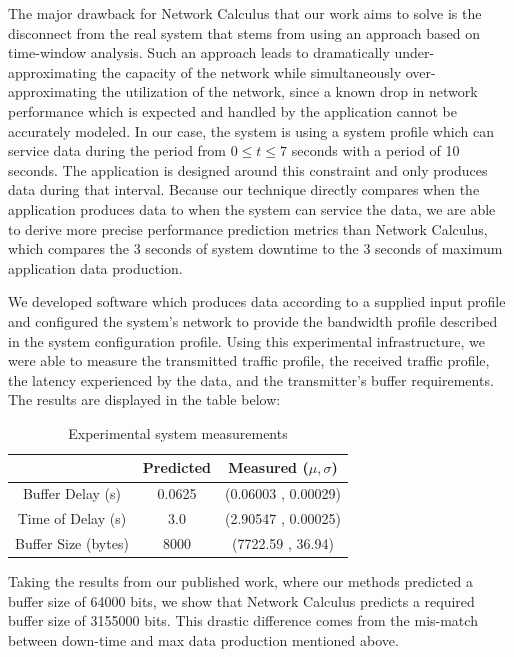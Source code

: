 The major drawback for Network Calculus that our work aims to solve is
the disconnect from the real system that stems from using an approach
based on time-window analysis.  Such an approach leads to dramatically
under-approximating the capacity of the network while simultaneously
over-approximating the utilization of the network, since a known drop
in network performance which is expected and handled by the
application cannot be accurately modeled.  In our case, the system is
using a system profile which can service data during the period from
$0\le t\le 7$ seconds with a period of 10 seconds.  The
application is designed around this constraint and only produces data
during that interval.  Because our technique directly compares when
the application produces data to when the system can service the data,
we are able to derive more precise performance prediction metrics than
Network Calculus, which compares the 3 seconds of system downtime to
the 3 seconds of maximum application data production.

We developed software which produces data according to a supplied
input profile and configured the system's network to provide the
bandwidth profile described in the system configuration profile.
Using this experimental infrastructure, we were able to measure the
transmitted traffic profile, the received traffic profile, the latency
experienced by the data, and the transmitter's buffer requirements.
The results are displayed in the table below:

\begin{table}[htbp]
\caption{Experimental system measurements}
\begin{tabular}{| c | c | c |}
\hline
 & Predicted & Measured ($\mu,\sigma$) \\\hline
Buffer Delay (s) & 0.0625 & (0.06003 , 0.00029) \\\hline
Time of Delay (s) & 3.0 & (2.90547 , 0.00025) \\\hline
Buffer Size (bytes) & 8000 & (7722.59 , 36.94) \\\hline
\end{tabular}
\label{table:results}
\end{table}

Taking the results from our published work, where our methods
predicted a buffer size of 64000 bits, we show that
Network Calculus predicts a required buffer size of 3155000 bits. This
drastic difference comes from the mis-match between down-time and max
data production mentioned above.

\newpage

